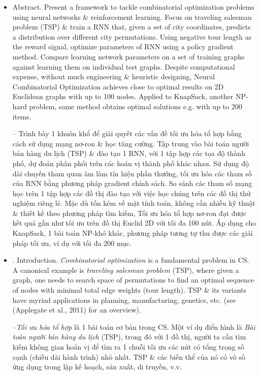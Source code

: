 \documentclass{article}
\begin{document}
\begin{itemize}
    \item {\sf Abstract.} Present a framework to tackle combinatorial optimization problems using neural networks \& reinforcement learning. Focus on traveling salesman problem (TSP) \& train a RNN that, given a set of city coordinates, predicts a distribution over different city permutations. Using negative tour length as the reward signal, optimize parameters of RNN using a policy gradient method. Compare learning network parameters on a set of training graphs against learning them on individual test graphs. Despite computational expense, without much engineering \& heuristic designing, Neural Combinatorial Optimization achieves close to optimal results on 2D Euclidean graphs with up to 100 nodes. Applied to KnapSack, another NP-hard problem, same method obtains optimal solutions e.g. with up to 200 items.
    
    -- Trình bày 1 khuôn khổ để giải quyết các vấn đề tối ưu hóa tổ hợp bằng cách sử dụng mạng nơ-ron \& học tăng cường. Tập trung vào bài toán người bán hàng du lịch (TSP) \& đào tạo 1 RNN, với 1 tập hợp các tọa độ thành phố, dự đoán phân phối trên các hoán vị thành phố khác nhau. Sử dụng độ dài chuyến tham quan âm làm tín hiệu phần thưởng, tối ưu hóa các tham số của RNN bằng phương pháp gradient chính sách. So sánh các tham số mạng học trên 1 tập hợp các đồ thị đào tạo với việc học chúng trên các đồ thị thử nghiệm riêng lẻ. Mặc dù tốn kém về mặt tính toán, không cần nhiều kỹ thuật \& thiết kế theo phương pháp tìm kiếm, Tối ưu hóa tổ hợp nơ-ron đạt được kết quả gần như tối ưu trên đồ thị Euclid 2D với tối đa 100 nút. Áp dụng cho KnapSack, 1 bài toán NP-khó khác, phương pháp tương tự thu được các giải pháp tối ưu, ví dụ với tối đa 200 mục.
    \item {. Introduction.} {\it Combinatorial optimization} is a fundamental problem in CS. A canonical example is {\it traveling salesman problem} (TSP), where given a graph, one needs to search space of permutations to find an optimal sequence of nodes with minimal total edge weights (tour length). TSP \& its variants have myriad applications in planning, manufacturing, genetics, etc. (see (Applegate et al., 2011) for an overview).
    
    --{\it Tối ưu hóa tổ hợp} là 1 bài toán cơ bản trong CS. Một ví dụ điển hình là {\it Bài toán người bán hàng du lịch} (TSP), trong đó với 1 đồ thị, người ta cần tìm kiếm không gian hoán vị để tìm ra 1 chuỗi tối ưu các nút có tổng trọng số cạnh (chiều dài hành trình) nhỏ nhất. TSP \& các biến thể của nó có vô số ứng dụng trong lập kế hoạch, sản xuất, di truyền, v.v.
        

\end{itemize}
\end{document}
